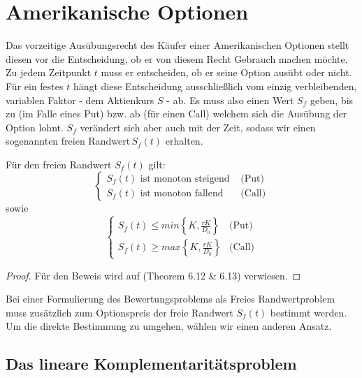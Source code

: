 \section{Amerikanische Optionen}                            %
\label{cha:AmerikanischeOptionen}                           %



Das vorzeitige Ausübungsrecht des Käufer einer Amerikanischen Optionen stellt diesen vor die Entscheidung, ob er von diesem Recht Gebrauch machen möchte. Zu jedem Zeitpunkt $t$ muss er entscheiden, ob er seine Option ausübt oder nicht. Für ein festes $t$ hängt diese Entscheidung ausschließlich vom einzig verbleibenden, variablen Faktor - dem Aktienkurs $S$ - ab. Es muss also einen Wert $S_f$ geben, bis zu (im Falle eines Put) bzw. ab (für einen Call) welchem sich die Ausübung der Option lohnt. $S_f$ verändert sich aber auch mit der Zeit, sodass wir einen sogenannten \glqq freien Randwert\grqq\,$S_f(t)$ erhalten.
\begin{satz} \label{BS:Sf}
Für den freien Randwert $S_f(t)$ gilt:
\[
\begin{cases}
S_f(t) \text{ ist monoton steigend } & \text{(Put)}\\
S_f(t) \text{ ist monoton fallend } & \text{(Call)}
\end{cases}
\]
sowie
\[
\begin{cases}
S_f(t) \leq min\left\{K,\frac{rK}{D_0}\right\} & \text{(Put)}\\
S_f(t) \geq max\left\{K,\frac{rK}{D_0}\right\} & \text{(Call)}
\end{cases}
\]
\end{satz}
\begin{proof}
Für den Beweis wird auf \cite{Jiang} (Theorem 6.12 \& 6.13) verwiesen.
\end{proof}

 
Bei einer Formulierung des Bewertungsproblems als \glqq Freies Randwertproblem\grqq\, muss zusätzlich zum Optionspreis der freie Randwert $S_f(t)$ bestimmt werden. Um die direkte Bestimmung zu umgehen, wählen wir einen anderen Ansatz.

 
\subsection{Das lineare Komplementaritätsproblem}           %

